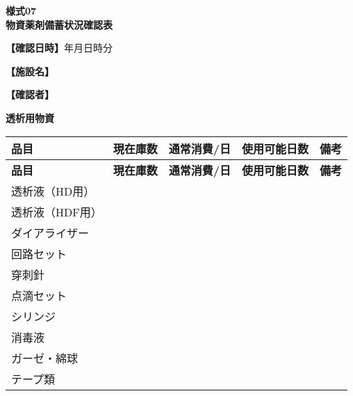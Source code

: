 \documentclass[a4paper,12pt]{jarticle}
\newcommand{\underlinespace}[1]{\underline{\hspace{#1}}}
\begin{document}
\begin{center}
{\Large\textbf{様式07}}\\
\vspace{3mm}
{\Large\textbf{物資薬剤備蓄状況確認表}}
\end{center}
\vspace{5mm}

\noindent
\textbf{【確認日時】}\underlinespace{2cm}年\underlinespace{1cm}月\underlinespace{1cm}日\underlinespace{1cm}時\underlinespace{1cm}分

\vspace{3mm}

\noindent
\textbf{【施設名】} \underlinespace{10cm}

\vspace{3mm}

\noindent
\textbf{【確認者】} \underlinespace{10cm}

\vspace{8mm}

\begin{center}
\textbf{\large 透析用物資}
\end{center}

\vspace{3mm}

\begin{longtable}{|p{3.5cm}|p{2.5cm}|p{2.5cm}|p{2.5cm}|p{2.5cm}|}
\hline
\textbf{品目} & \textbf{現在庫数} & \textbf{通常消費/日} & \textbf{使用可能日数} & \textbf{備考} \\
\hline
\endfirsthead

\hline
\textbf{品目} & \textbf{現在庫数} & \textbf{通常消費/日} & \textbf{使用可能日数} & \textbf{備考} \\
\hline
\endhead

透析液（HD用） &  &  &  &  \\
\hline
透析液（HDF用） &  &  &  &  \\
\hline
ダイアライザー &  &  &  &  \\
\hline
回路セット &  &  &  &  \\
\hline
穿刺針 &  &  &  &  \\
\hline
点滴セット &  &  &  &  \\
\hline
シリンジ &  &  &  &  \\
\hline
消毒液 &  &  &  &  \\
\hline
ガーゼ・綿球 &  &  &  &  \\
\hline
テープ類 &  &  &  &  \\
\hline
\end{longtable}
\end{document}
